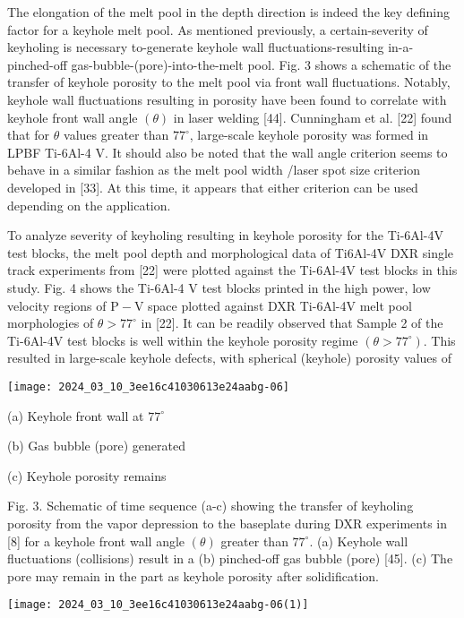 \documentclass[10pt]{article}
\begin{document}
The elongation of the melt pool in the depth direction is indeed the key defining factor for a keyhole melt pool. As mentioned previously, a certain-severity of keyholing is necessary to-generate keyhole wall fluctuations-resulting in-a-pinched-off gas-bubble-(pore)-into-the-melt pool. Fig. 3 shows a schematic of the transfer of keyhole porosity to the melt pool via front wall fluctuations. Notably, keyhole wall fluctuations resulting in porosity have been found to correlate with keyhole front wall angle $(\theta)$ in laser welding [44]. Cunningham et al. [22] found that for $\theta$ values greater than $77^{\circ}$, large-scale keyhole porosity was formed in LPBF Ti-6Al-4 V. It should also be noted that the wall angle criterion seems to behave in a similar fashion as the melt pool width /laser spot size criterion developed in [33]. At this time, it appears that either criterion can be used depending on the application.

To analyze severity of keyholing resulting in keyhole porosity for the Ti-6Al-4V test blocks, the melt pool depth and morphological data of Ti6Al-4V DXR single track experiments from [22] were plotted against the Ti-6Al-4V test blocks in this study. Fig. 4 shows the Ti-6Al-4 V test blocks printed in the high power, low velocity regions of $\mathrm{P}-\mathrm{V}$ space plotted against DXR Ti-6Al-4V melt pool morphologies of $\theta>77^{\circ}$ in [22]. It can be readily observed that Sample 2 of the Ti-6Al-4V test blocks is well within the keyhole porosity regime $\left(\theta>77^{\circ}\right)$. This resulted in large-scale keyhole defects, with spherical (keyhole) porosity values of

\begin{center}
\texttt{[image: 2024\_03\_10\_3ee16c41030613e24aabg-06]}
\end{center}

(a) Keyhole front wall at $77^{\circ}$

(b) Gas bubble (pore) generated

(c) Keyhole porosity remains

Fig. 3. Schematic of time sequence (a-c) showing the transfer of keyholing porosity from the vapor depression to the baseplate during DXR experiments in [8] for a keyhole front wall angle $(\theta)$ greater than $77^{\circ}$. (a) Keyhole wall fluctuations (collisions) result in a (b) pinched-off gas bubble (pore) [45]. (c) The pore may remain in the part as keyhole porosity after solidification.

\begin{center}
\texttt{[image: 2024\_03\_10\_3ee16c41030613e24aabg-06(1)]}
\end{center}
\end{document}
